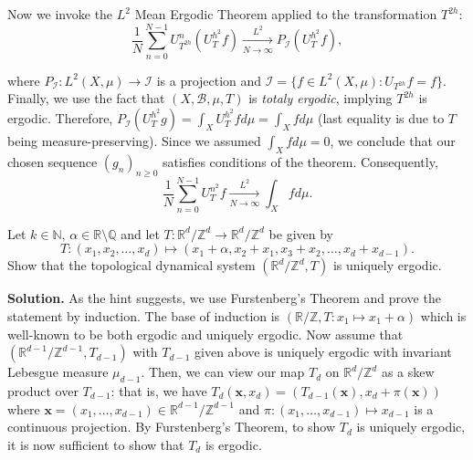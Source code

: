\documentclass{template}
\begin{document}
Now we invoke the $L^2$ Mean Ergodic Theorem applied to the transformation $T^{2h}$:
\begin{equation*}
    \frac{1}{N}\sum_{n=0}^{N-1}U_{T^{2h}}^n(U_T^{h^2}f) \xrightarrow[N \to \infty]{L^2} P_{\mathcal{I}}(U_T^{h^2}f),
\end{equation*}

where $P_{\mathcal{I}}: L^2(X,\mu) \to \mathcal{I}$ is a projection and
$\mathcal{I} = \{f \in L^2(X,\mu): U_{T^{2h}}f = f\}$. Finally, we use the fact
that $(X,\mathcal{B},\mu,T)$ is \textit{totaly ergodic}, implying $T^{2h}$ is
ergodic. Therefore, $P_{\mathcal{I}}(U_T^{h^2}g) = \int_X U_T^{h^2}fd\mu =
\int_X fd\mu$ (last equality is due to $T$ being measure-preserving).
Since we assumed $\int_X fd\mu = 0$, we conclude that our chosen sequence 
$(g_n)_{n \geq 0}$ satisfies conditions of the theorem. Consequently,
\begin{equation*}
    \frac{1}{N}\sum_{n=0}^{N-1}U_T^{n^2}f \xrightarrow[N \to \infty]{L^2} \int_X fd\mu.
\end{equation*}

\begin{problem}[Exercise 2]
    Let $k \in \mathbb{N}$, $\alpha \in \mathbb{R} \setminus \mathbb{Q}$ and let 
    $T: \mathbb{R}^d/\mathbb{Z}^d \to \mathbb{R}^d/\mathbb{Z}^d$ be given by
    \begin{equation*}
        T: (x_1,x_2,\dots,x_d) \mapsto (x_1+\alpha, x_2+x_1, x_3+x_2,\dots, x_d + x_{d-1}).
    \end{equation*}
    Show that the topological dynamical system $(\mathbb{R}^d/\mathbb{Z}^d,T)$ is uniquely ergodic.
\end{problem}

\textbf{Solution.} As the hint suggests, we use Furstenberg's Theorem and prove
the statement by induction. The base of induction is $(\mathbb{R}/\mathbb{Z}, T:
x_1 \mapsto x_1+\alpha)$ which is well-known to be both ergodic and uniquely
ergodic. Now assume that $(\mathbb{R}^{d-1}/\mathbb{Z}^{d-1},T_{d-1})$ with
$T_{d-1}$ given above is uniquely ergodic with invariant Lebesgue measure
$\mu_{d-1}$. Then, we can view our map $T_d$ on $\mathbb{R}^d/\mathbb{Z}^d$ as a
skew product over $T_{d-1}$: that is, we have $T_d(\mathbf{x}, x_d) =
(T_{d-1}(\mathbf{x}), x_d + \pi(\mathbf{x}))$ where $\mathbf{x}=(x_1,\dots,x_{d-1}) \in
\mathbb{R}^{d-1}/\mathbb{Z}^{d-1}$ and $\pi: (x_1,\dots,x_{d-1}) \mapsto x_{d-1}$
is a continuous projection. By Furstenberg's Theorem, to show $T_d$ is uniquely
ergodic, it is now sufficient to show that $T_d$ is ergodic.
\end{document}
